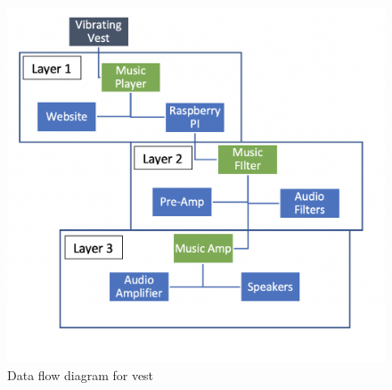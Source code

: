 \begin{figure}[h!]
	\centering
 	\includegraphics[width=\textwidth]{images/data_flow}
 \caption{Data flow diagram for vest}
\end{figure}
